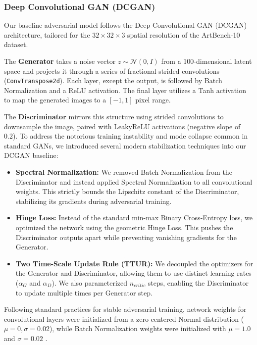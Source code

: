 \documentclass[runningheads]{llncs}
\begin{document}
\subsubsection{Deep Convolutional GAN (DCGAN)}
Our baseline adversarial model follows the Deep Convolutional GAN (DCGAN) architecture, tailored for the $32 \times 32 \times 3$ spatial resolution of the ArtBench-10 dataset. 

The \textbf{Generator} takes a noise vector $z \sim \mathcal{N}(0, I)$ from a 100-dimensional latent space and projects it through a series of fractional-strided convolutions (\texttt{ConvTranspose2d}). Each layer, except the output, is followed by Batch Normalization and a ReLU activation. The final layer utilizes a Tanh activation to map the generated images to a $[-1, 1]$ pixel range.

The \textbf{Discriminator} mirrors this structure using strided convolutions to downsample the image, paired with LeakyReLU activations (negative slope of 0.2). To address the notorious training instability and mode collapse common in standard GANs, we introduced several modern stabilization techniques into our DCGAN baseline:
\begin{itemize}
    \item \textbf{Spectral Normalization:} We removed Batch Normalization from the Discriminator and instead applied Spectral Normalization to all convolutional weights. This strictly bounds the Lipschitz constant of the Discriminator, stabilizing its gradients during adversarial training.
    \item \textbf{Hinge Loss:} Instead of the standard min-max Binary Cross-Entropy loss, we optimized the network using the geometric Hinge Loss. This pushes the Discriminator outputs apart while preventing vanishing gradients for the Generator.
    \item \textbf{Two Time-Scale Update Rule (TTUR):} We decoupled the optimizers for the Generator and Discriminator, allowing them to use distinct learning rates ($\alpha_G$ and $\alpha_D$). We also parameterized $n_{critic}$ steps, enabling the Discriminator to update multiple times per Generator step.
\end{itemize}

Following standard practices for stable adversarial training, network weights for convolutional layers were initialized from a zero-centered Normal distribution ($\mu=0, \sigma=0.02$), while Batch Normalization weights were initialized with $\mu=1.0$ and $\sigma=0.02$ \cite{radford2015unsupervised}.
\end{document}
